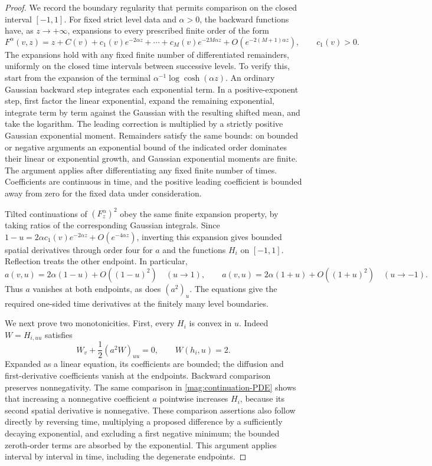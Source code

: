 \begin{proof}
We record the boundary regularity that permits comparison on the closed
interval $[-1,1]$. For fixed strict level data and $\alpha>0$, the backward
functions have, as $z\to+\infty$, expansions to every prescribed finite
order of the form
\begin{equation}\label{mag:asymptotic}
 F^\alpha(v,z)
  =z+C(v)+c_1(v)e^{-2\alpha z}+\cdots
       +c_M(v)e^{-2M\alpha z}
       +O(e^{-2(M+1)\alpha z}),\qquad c_1(v)>0.
\end{equation}
The expansions hold with any fixed finite number of differentiated
remainders, uniformly on the closed time intervals between successive
levels. To verify this, start from the expansion of the terminal
$\alpha^{-1}\log\cosh(\alpha z)$. An ordinary Gaussian backward step
integrates each exponential term. In a positive-exponent step, first
factor the linear exponential, expand the remaining exponential, integrate
term by term against the Gaussian with the resulting shifted mean, and
take the logarithm. The leading correction is multiplied by a strictly
positive Gaussian exponential moment. Remainders satisfy the same bounds:
on bounded or negative arguments an exponential bound of the indicated
order dominates their linear or exponential growth, and Gaussian
exponential moments are finite. The argument applies after differentiating
any fixed finite number of times. Coefficients are continuous in time,
and the positive leading coefficient is bounded away from zero for the
fixed data under consideration.

Tilted continuations of $(F_z^\alpha)^2$ obey the same finite expansion
property, by taking ratios of the corresponding Gaussian integrals.
Since
$1-u=2\alpha c_1(v)e^{-2\alpha z}+O(e^{-4\alpha z})$,
inverting this expansion gives bounded spatial derivatives through order
four for $a$ and the functions $H_i$ on $[-1,1]$. Reflection treats the
other endpoint. In particular,
\[
 a(v,u)=2\alpha(1-u)+O((1-u)^2)\quad(u\to1),
 \qquad
 a(v,u)=2\alpha(1+u)+O((1+u)^2)\quad(u\to-1).
\]
Thus $a$ vanishes at both endpoints, as does $(a^2)_u$.
The equations give the required one-sided time derivatives at the
finitely many level boundaries.

We next prove two monotonicities. First, every $H_i$ is convex in $u$.
Indeed $W=H_{i,uu}$ satisfies
\[
 W_v+\frac12(a^2W)_{uu}=0,
 \qquad W(h_i,u)=2.
\]
Expanded as a linear equation, its coefficients are bounded; the diffusion
and first-derivative coefficients vanish at the endpoints. Backward
comparison preserves nonnegativity. The same comparison in
\eqref{mag:continuation-PDE} shows that increasing a nonnegative
coefficient $a$ pointwise increases $H_i$, because its second spatial
derivative is nonnegative. These comparison assertions also follow
directly by reversing time, multiplying a proposed difference by a
sufficiently decaying exponential, and excluding a first negative
minimum; the bounded zeroth-order terms are absorbed by the exponential.
This argument applies interval by interval in time, including the
degenerate endpoints.


\end{proof}
